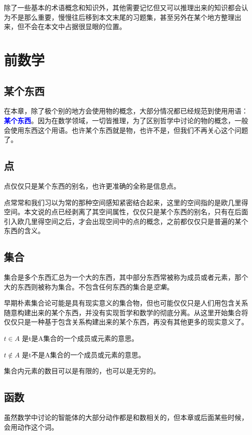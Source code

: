 \documentclass[12pt,oneside]{book}
\renewcommand{\emph}[1]{\textcolor{blue}{\textbf{#1}}}
\begin{document}
除了一些基本的术语概念和知识外，其他需要记忆但又可以推理出来的知识都会认为不是那么重要，慢慢往后移到本文末尾的习题集，甚至另外在某个地方整理出来，但不会在本文中占据很显眼的位置。


\chapter{前数学}
\section{某个东西}
在本章，除了极个别的地方会使用物的概念，大部分情况都已经规范到使用用语：\emph{某个东西}。因为在数学领域，一切皆推理，为了区别哲学中讨论的物的概念，一般会使用东西这个用语。也许某个东西就是物，也许不是，但我们不再关心这个问题了。


\section{点}
点仅仅只是某个东西的别名，也许更准确的全称是信息点。

点常常和我们习以为常的那种空间感知紧密结合起来，这里的空间指的是欧几里得空间。本文说的点已经剥离了其空间属性，仅仅只是某个东西的别名，只有在后面引入欧几里得空间之后，才会出现空间中的点的概念，之前都仅仅只是普遍的某个东西的含义。



\section{集合}
集合是多个东西汇总为一个大的东西，其中部分东西常被称为成员或者元素，那个大的东西则被称为集合。不包含任何东西的集合是\textit{空集}。

早期朴素集合论可能是具有现实意义的集合物，但也可能仅仅只是人们用包含关系随意构建出来的某个东西，并没有实现哲学和数学的彻底分离。从这里开始集合将仅仅只是一种基于包含关系构建出来的某个东西，再没有其他更多的现实意义了。

$t \in A$ 是t是A集合的一个成员或元素的意思。

$t \notin A$ 是t不是A集合的一个成员或元素的意思。

集合内元素的数目可以是有限的，也可以是无穷的。



\section{函数}
虽然数学中讨论的智能体的大部分动作都是和数相关的，但本章或后面某些时候，会用动作这个词。
\end{document}
